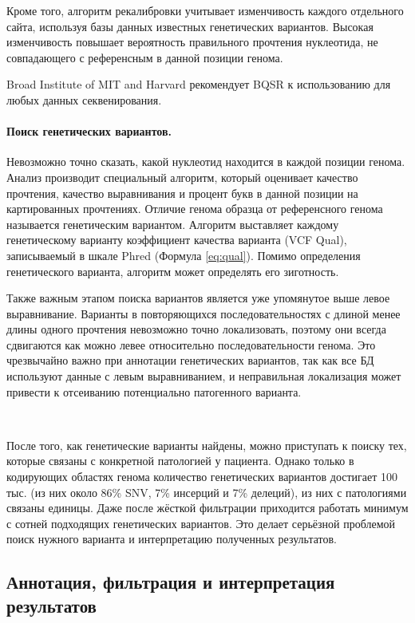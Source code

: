 \documentclass[a4paper,12pt]{article}
\begin{document}
Кроме того, алгоритм рекалибровки учитывает изменчивость каждого отдельного сайта, используя базы данных известных генетических вариантов.
Высокая изменчивость повышает вероятность правильного прочтения нуклеотида, не совпадающего с референсным в данной позиции генома.

Broad Institute of MIT and Harvard рекомендует BQSR к использованию для любых данных секвенирования\cite{Auwera_2013}.

\paragraph{Поиск генетических вариантов.}
Невозможно точно сказать, какой нуклеотид находится в каждой позиции генома.
Анализ производит специальный алгоритм, который оценивает качество прочтения, качество выравнивания и процент букв в данной позиции на картированных прочтениях.
Отличие генома образца от референсного генома называется генетическим вариантом.
Алгоритм выставляет каждому генетическому варианту коэффициент качества варианта (VCF Qual), записываемый в шкале Phred (Формула \ref{eq:qual}).
Помимо определения генетического варианта, алгоритм может определять его зиготность.

Также важным этапом поиска вариантов является уже упомянутое выше левое выравнивание.
Варианты в повторяющихся последовательностях с длиной менее длины одного прочтения невозможно точно локализовать, поэтому они всегда сдвигаются как можно левее относительно последовательности генома.
Это чрезвычайно важно при аннотации генетических вариантов, так как все БД используют данные с левым выравниванием, и неправильная локализация может привести к отсеиванию потенциально патогенного варианта.

~

После того, как генетические варианты найдены, можно приступать к поиску тех, которые связаны с конкретной патологией у пациента.
Однако только в кодирующих областях генома количество генетических вариантов достигает 100 тыс. (из них около 86\% SNV, 7\% инсерций и 7\% делеций)\cite{Supernat_2018}, из них с патологиями связаны единицы.
Даже после жёсткой фильтрации приходится работать минимум с сотней подходящих генетических вариантов.
Это делает серьёзной проблемой поиск нужного варианта и интерпретацию полученных результатов.

\subsection{Аннотация, фильтрация и интерпретация результатов}
\end{document}
